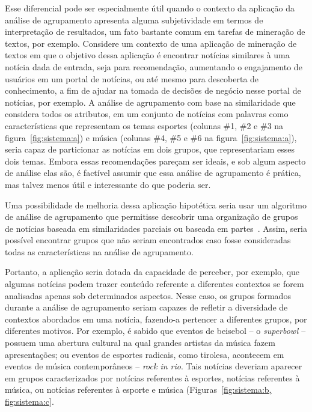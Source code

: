 \documentclass[
    12pt,                %
    oneside,            %
    a4paper,            %
    english,            %
    brazil                %
    ]{abntex2ppgsi}
\begin{document}
Esse diferencial pode ser especialmente útil quando o contexto da aplicação da análise de agrupamento apresenta alguma subjetividade em termos de interpretação de resultados, um fato bastante comum em tarefas de mineração de textos, por exemplo.
Considere um contexto de uma aplicação de mineração de textos em que o objetivo dessa aplicação é encontrar notícias similares à uma notícia dada de entrada, seja para recomendação, aumentando o engajamento de usuários em um portal de notícias, ou até mesmo para descoberta de conhecimento, a fim de ajudar na tomada de decisões de negócio nesse portal de notícias, por exemplo.
A análise de agrupamento com base na similaridade que considera todos os atributos, em um conjunto de notícias com palavras como características que representam os temas esportes (colunas \#1, \#2 e \#3 na figura~\ref{fig:sistema:a}) e música (colunas \#4, \#5 e \#6 na figura~\ref{fig:sistema:a}), seria capaz de particionar as notícias em dois grupos, que representariam esses dois temas.
Embora essas recomendações pareçam ser ideais, e sob algum aspecto de análise elas são, é factível assumir que essa análise de agrupamento é prática, mas talvez menos útil e interessante do que poderia ser.

Uma possibilidade de melhoria dessa aplicação hipotética seria usar um algoritmo de análise de agrupamento que permitisse descobrir uma organização de grupos de notícias baseada em similaridades parciais ou baseada em partes~\cite{Franca2010, Ho2008}.
Assim, seria possível encontrar grupos que não seriam encontrados caso fosse consideradas todas as características na análise de agrupamento.

Portanto, a aplicação seria dotada da capacidade de perceber, por exemplo, que algumas notícias podem trazer conteúdo referente a diferentes contextos se forem analisadas apenas sob determinados aspectos.
Nesse caso, os grupos formados durante a análise de agrupamento seriam capazes de refletir a diversidade de contextos abordados em uma notícia, fazendo-a pertencer a diferentes grupos, por diferentes motivos.
Por exemplo, é sabido que eventos de beisebol -- o \textit{superbowl} -- possuem uma abertura cultural na qual grandes artistas da música fazem apresentações; ou eventos de esportes radicais, como tirolesa, acontecem em eventos de música contemporâneos -- \textit{rock in rio}.
Tais notícias deveriam aparecer em grupos caracterizados por notícias referentes à esportes, notícias referentes à música, ou notícias referentes à esporte e música (Figuras~\ref{fig:sistema:b, fig:sistema:c}.
\end{document}
